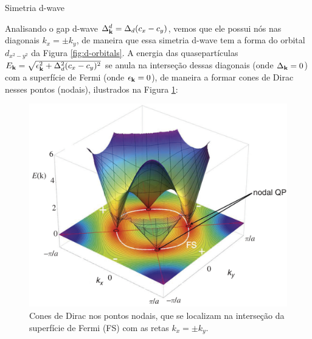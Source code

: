 \documentclass[8pt,aspectratio=169,xcolor={table,dvipsnames,usenames}]{beamer}
\begin{document}
\begin{frame}{Simetria d-wave}

\n

Analisando o gap d-wave $\Delta_{\vb{k}}^d = \Delta_d (c_x - c_y)$, vemos que ele possui nós nas diagonais $k_x = \pm k_y$, de maneira que essa simetria d-wave tem a forma do orbital $d_{x^2-y^2}$ da Figura \ref{fig:d-orbitals}. A energia das quasepartículas $E_{\vb{k}} = \sqrt{\epsilon_{\vb{k}}^2 + \Delta_d^2 (c_x - c_y)^2}$ se anula na interseção dessas diagonais (onde $\Delta_{\vb{k}} = 0$) com a superfície de Fermi (onde $\epsilon_{\vb{k}} = 0$), de maneira a formar cones de Dirac nesses pontos (nodais), ilustrados na Figura \ref{fig:fermisurf}:

\begin{figure}[H]
\centering
\includegraphics[width=0.45\linewidth]{fig/fermisurf.png}
\caption{Cones de Dirac nos pontos nodais, que se localizam na interseção da superfície de Fermi (FS) com as retas $k_x = \pm k_y$.}
\label{fig:fermisurf}
\end{figure}


\end{frame}

\end{document}
